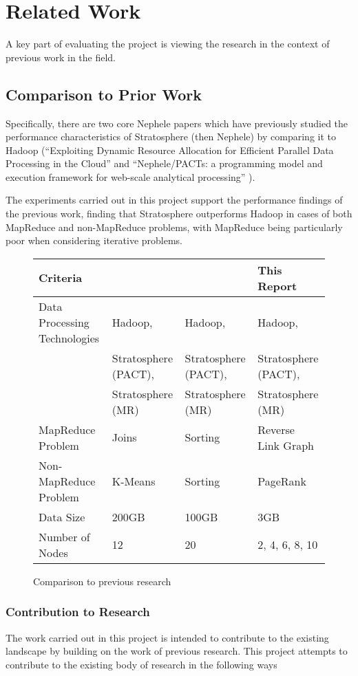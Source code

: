 \section{Related Work}
A key part of evaluating the project is viewing the research in the context of previous work in the field.

\subsection{Comparison to Prior Work}
Specifically, there are two core Nephele papers which have previously studied the performance characteristics of Stratosphere (then Nephele) by comparing it to Hadoop (``Exploiting Dynamic Resource Allocation for Efficient Parallel Data Processing in the Cloud'' \cite{warneke2011exploiting} and ``Nephele/PACTs: a programming model and execution framework for web-scale analytical processing'' \cite{battre2010socc}). 

The experiments carried out in this project support the performance findings of the previous work, finding that Stratosphere outperforms Hadoop in cases of both MapReduce and non-MapReduce problems, with MapReduce being particularly poor when considering iterative problems.

\begin{figure}
\centering
\begin{tabular}{l|lll}
	\toprule
	Criteria & \cite{warneke2011exploiting} & \cite{battre2010socc} & This Report \\
	\hline
	Data Processing Technologies & Hadoop,  & Hadoop, & Hadoop, \\
	& Stratosphere (PACT), & Stratosphere (PACT), & Stratosphere (PACT), \\
	& Stratosphere (MR) & Stratosphere (MR) & Stratosphere (MR) \\
	\hline
	MapReduce Problem & Joins & Sorting & Reverse Link Graph \\
	\hline
	Non-MapReduce Problem & K-Means & Sorting & PageRank \\
	\hline
	Data Size & 200GB & 100GB & 3GB \\
	\hline
	Number of Nodes & 12 & 20 & 2, 4, 6, 8, 10 \\
	\bottomrule
\end{tabular}
\caption{Comparison to previous research}
\end{figure}

\subsubsection{Contribution to Research}
The work carried out in this project is intended to contribute to the existing landscape by building on the work of previous research. This project attempts to contribute to the existing body of research in the following ways

